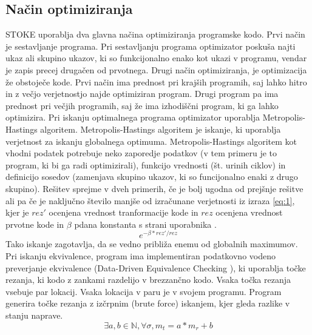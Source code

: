 \documentclass[a4paper, 12pt]{book}
\begin{document}
	\subsection{Način optimiziranja}
	STOKE uporablja dva glavna načina optimiziranja programske kodo. Prvi način je sestavljanje programa. Pri sestavljanju programa optimizator poskuša najti ukaz ali skupino ukazov, ki so funkcijonalno enako kot ukazi v programu, vendar je zapis precej drugačen od prvotnega. Drugi način optimiziranja, je optimizacija že obstoječe kode. Prvi način ima prednost pri krajših programih, saj lahko hitro in z večjo verjetnostjo najde optimiziran program. Drugi program pa ima prednost pri večjih programih, saj že ima izhodiščni program, ki ga lahko optimizira. Pri iskanju optimalnega programa optimizator uporablja Metropolis-Hastings algoritem. Metropolis-Hastings algoritem je iskanje, ki uporablja verjetnost za iskanju globalnega optimuma. Metropolis-Hastings algoritem kot vhodni podatek potrebuje neko zaporedje podatkov (v tem primeru je to program, ki bi ga radi optimizirali), funkcijo vrednosti (št. urinih ciklov) in definicijo sosedov (zamenjava skupino ukazov, ki so funcijonalno enaki z drugo skupino). Rešitev sprejme v dveh primerih, če je bolj ugodna od prejšnje rešitve ali pa če je naključno število manjše od izračunane verjetnosti iz izraza \ref{eq:1}, kjer je \( rez'\) ocenjena vrednost tranformacije kode in \( rez\) ocenjena vrednost prvotne kode in \(\beta\) pdana konstanta s strani uporabnika \cite{ann,article1}.
	\begin{equation}
	e^{-\beta*rez'/rez} 
	\label{eq:1}
	\end{equation}
	 Tako iskanje zagotavlja, da se vedno približa enemu od globalnih maximumov. Pri iskanju ekvivalence, program ima implementiran  podatkovno vodeno preverjanje ekvivalence (Data-Driven Equivalence Checking \cite{article2}), ki uporablja točke rezanja, ki kodo z zankami razdelijo v brezzančno kodo. Vsaka točka rezanja vsebuje par lokacij. Vsaka lokacija v paru je v svojem programu. Program generira točke rezanja z izčrpnim (brute force) iskanjem, kjer gleda razlike v stanju naprave. 
	 \begin{equation}
	 \exists{a,b} \in \mathbb{N}, \forall \sigma  ,m_t = a*m_r + b 
	 \label{eq:2}
	 \end{equation}
\end{document}
